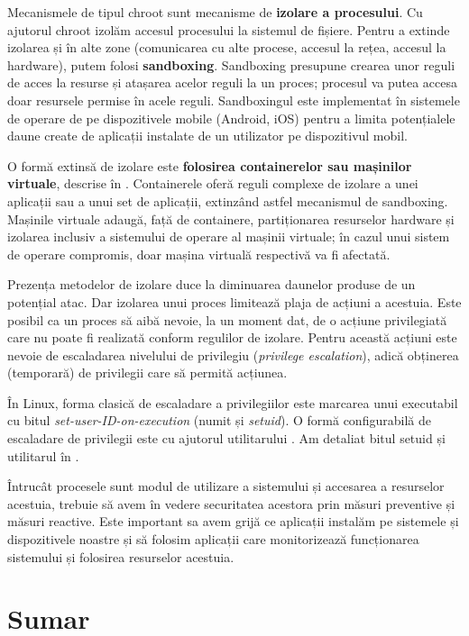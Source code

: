 Mecanismele de tipul chroot sunt mecanisme de \textbf{izolare a procesului}. Cu ajutorul chroot izolăm accesul procesului la sistemul de fișiere. Pentru a extinde izolarea și în alte zone (comunicarea cu alte procese, accesul la rețea, accesul la hardware), putem folosi \textbf{sandboxing}. Sandboxing presupune crearea unor reguli de acces la resurse și atașarea acelor reguli la un proces; procesul va putea accesa doar resursele permise în acele reguli. Sandboxingul este implementat în sistemele de operare de pe dispozitivele mobile (Android, iOS) pentru a limita potențialele daune create de aplicații instalate de un utilizator pe dispozitivul mobil.

O formă extinsă de izolare este \textbf{folosirea containerelor sau mașinilor virtuale}, descrise în . Containerele oferă reguli complexe de izolare a unei aplicații sau a unui set de aplicații, extinzând astfel mecanismul de sandboxing. Mașinile virtuale adaugă, față de containere, partiționarea resurselor hardware și izolarea inclusiv a sistemului de operare al mașinii virtuale; în cazul unui sistem de operare compromis, doar mașina virtuală respectivă va fi afectată.

Prezența metodelor de izolare duce la diminuarea daunelor produse de un potențial atac. Dar izolarea unui proces limitează plaja de acțiuni a acestuia. Este posibil ca un proces să aibă nevoie, la un moment dat, de o acțiune privilegiată care nu poate fi realizată conform regulilor de izolare. Pentru această acțiuni este nevoie de escaladarea nivelului de privilegiu (\textit{privilege escalation}), adică obținerea (temporară) de privilegii care să permită acțiunea.

În Linux, forma clasică de escaladare a privilegiilor este marcarea unui executabil cu bitul \textit{set-user-ID-on-execution} (numit și \textit{setuid}).
O formă configurabilă de escaladare de privilegii este cu ajutorul utilitarului .
Am detaliat bitul setuid și utilitarul  în .

Întrucât procesele sunt modul de utilizare a sistemului și accesarea a resurselor acestuia, trebuie să avem în vedere securitatea acestora prin măsuri preventive și măsuri reactive. Este important sa avem grijă ce aplicații instalăm pe sistemele și dispozitivele noastre și să folosim aplicații care monitorizează funcționarea sistemului și folosirea resurselor acestuia.

\section{Sumar}
\label{sec:sec:summary}

